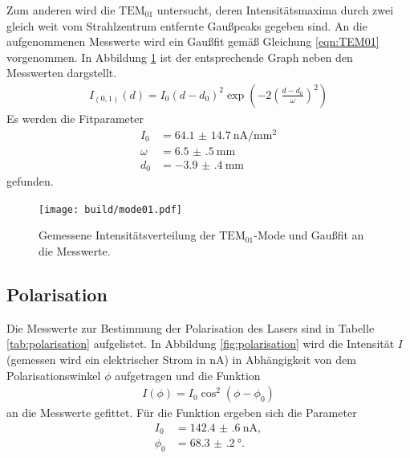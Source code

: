 Zum anderen wird die \textbf{$\text{TEM}_{01}$} untersucht, deren Intensitätsmaxima durch
zwei gleich weit vom Strahlzentrum entfernte Gaußpeaks gegeben sind.
An die aufgenommenen Messwerte wird ein Gaußfit gemäß Gleichung \ref{eqn:TEM01} vorgenommen.
In Abbildung \ref{fig:mode01} ist der entsprechende Graph neben den Messwerten dargstellt.
\begin{align}
  I_{(0,1)}(d) = I_{0} \left( d - d_{0} \right)^{2}
  \exp\left( -2 \left( \frac{d - d_{0}}{\omega}\right)^2 \right)\label{eqn:TEM01}
\end{align}
Es werden die Fitparameter
 \begin{align*}
   I_{0} &= \SI{64.1(147)}{\nano\ampere\per\milli\meter\squared}\\ \omega &=\SI{6.5(5)}{\milli\meter}\\    d_{0} &= \SI{-3.9(4)}{\milli\meter}
 \end{align*}
gefunden.
\begin{figure}
  \centering
  \texttt{[image: build/mode01.pdf]}
  \caption{Gemessene Intensitätsverteilung der \textbf{$\text{TEM}_{01}$}-Mode und Gaußfit an die Messwerte.}
  \label{fig:mode01}
\end{figure}



\subsection{Polarisation}
\label{subsec:Polarisation}
Die Messwerte zur Bestimmung der Polarisation des Lasers sind in Tabelle \ref{tab:polarisation} aufgelistet.
In Abbildung \ref{fig:polarisation} wird die Intensität $I$(gemessen wird ein elektrischer Strom in $\si{\nano\ampere}$)
in Abhängigkeit von dem Polarisationswinkel $\phi$
aufgetragen und die Funktion
\begin{align}
I(\phi)=I_0 \cos^2\left(\phi-\phi_0\right)
\end{align}
an die Messwerte gefittet.
Für die Funktion ergeben sich die Parameter
\begin{align}
I_0  & = \SI{142.4(6)}{\nano\ampere},\\
\phi_{0} & = \SI{68.3(2)}{\degree}.
\end{align}

